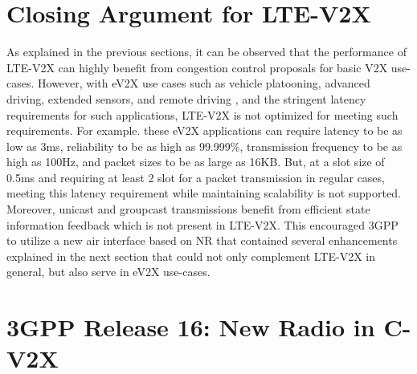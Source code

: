 \documentclass[iicol]{sn-jnl}%
\theoremstyle{thmstyleone}%
\theoremstyle{thmstyletwo}%
\theoremstyle{thmstylethree}%
\begin{document}
\section{Closing Argument for LTE-V2X}\label{sec6}
As explained in the previous sections, it can be observed that the performance of LTE-V2X can highly benefit from congestion control proposals for basic V2X use-cases. However, with eV2X use cases such as vehicle platooning, advanced driving, extended sensors, and remote driving \cite{3gppenhancement}, and the stringent latency requirements \cite{garcia2021tutorial} for such applications, LTE-V2X is not optimized for  meeting such requirements. For example.  these eV2X applications can require latency to be as low as 3ms, reliability to be as high as 99.999\%, transmission frequency to be as high as 100Hz, and packet sizes to be as large as 16KB. But, at a slot size of 0.5ms and requiring at least 2 slot for a packet transmission in regular cases, meeting this latency requirement while maintaining scalability is not supported. Moreover, unicast and groupcast transmissions benefit from efficient state information feedback which is not present in LTE-V2X.  This encouraged 3GPP to utilize a new air interface based on NR that contained several enhancements explained in the next section that could not only complement LTE-V2X in general, but also serve in eV2X use-cases. 






\section{3GPP Release 16: New Radio in C-V2X}\label{sec7}
\end{document}
